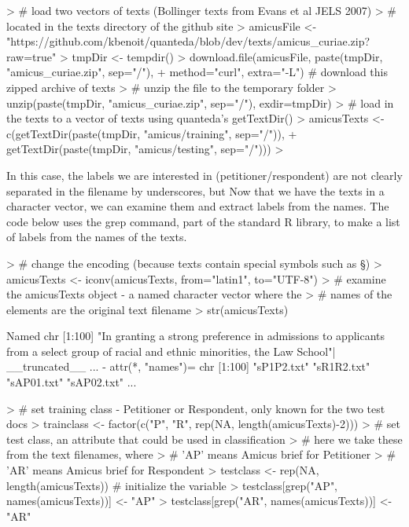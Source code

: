 \documentclass[11pt]{article}
\begin{document}
\begin{Schunk}
\begin{Sinput}
> # load two vectors of texts (Bollinger texts from Evans et al JELS 2007)
> # located in the texts directory of the github site
> amicusFile <- "https://github.com/kbenoit/quanteda/blob/dev/texts/amicus_curiae.zip?raw=true"
> tmpDir <- tempdir()
> download.file(amicusFile, paste(tmpDir, "amicus_curiae.zip", sep="/"), 
+               method="curl", extra="-L") # download this zipped archive of texts
> # unzip the file to the temporary folder
> unzip(paste(tmpDir, "amicus_curiae.zip", sep="/"), exdir=tmpDir) 
> # load in the texts to a vector of texts using quanteda's getTextDir()
> amicusTexts <- c(getTextDir(paste(tmpDir, "amicus/training", sep="/")), 
+                  getTextDir(paste(tmpDir, "amicus/testing", sep="/")))
> 
\end{Sinput}
\end{Schunk}

In this case, the labels we are interested in (petitioner/respondent) are not clearly separated in the filename by underscores, but Now that we have the texts in a character vector, we can examine them and extract labels from the names. The code below uses the grep command, part of the standard R library, to make a list of labels from the names of the texts.

\begin{Schunk}
\begin{Sinput}
> # change the encoding (because texts contain special symbols such as §)
> amicusTexts <- iconv(amicusTexts, from="latin1", to="UTF-8")
> # examine the amicusTexts object - a named character vector where the
> # names of the elements are the original text filename
> str(amicusTexts)
\end{Sinput}
\begin{Soutput}
 Named chr [1:100] "In granting a strong preference in admissions to applicants from a select group of racial and ethnic minorities, the Law School"| __truncated__ ...
 - attr(*, "names")= chr [1:100] "sP1P2.txt" "sR1R2.txt" "sAP01.txt" "sAP02.txt" ...
\end{Soutput}
\begin{Sinput}
> # set training class - Petitioner or Respondent, only known for the two test docs
> trainclass <- factor(c("P", "R", rep(NA, length(amicusTexts)-2)))
> # set test class, an attribute that could be used in classification
> # here we take these from the text filenames, where 
> # 'AP' means Amicus brief for Petitioner
> # 'AR' means Amicus brief for Respondent
> testclass  <- rep(NA, length(amicusTexts)) # initialize the variable
> testclass[grep("AP", names(amicusTexts))] <- "AP"
> testclass[grep("AR", names(amicusTexts))] <- "AR"
\end{Sinput}
\end{Schunk}
\end{document}
